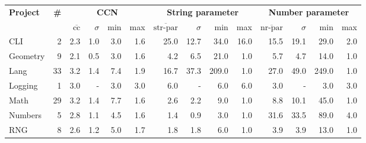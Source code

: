 \begin{tabular}{ l r | r@{\hskip 0.08in}r@{\hskip 0.08in}r@{\hskip 0.08in}r | r@{\hskip 0.08in}r@{\hskip 0.08in}r@{\hskip 0.08in}r | r@{\hskip 0.08in}r@{\hskip 0.08in}r@{\hskip 0.08in}r }
\hline 
\textbf{Project} & \textbf{\#} & \multicolumn{4}{c}{\textbf{CCN}} & \multicolumn{4}{c}{\textbf{String parameter}} & \multicolumn{4}{c}{\textbf{Number parameter}} \\ 
  &   & $\overline{\text{cc}}$ & $\sigma$ & min & max & $\overline{\text{str-par}}$ & $\sigma$ & min & max & $\overline{\text{nr-par}}$ & $\sigma$ & min & max \\ 
\hline 
CLI & 2 &2.3 &1.0 &3.0 & 1.6 &25.0 &12.7 &34.0 & 16.0 &15.5 &19.1 &29.0 & 2.0 \\ 
Geometry & 9 &2.1 &0.5 &3.0 & 1.6 &4.2 &6.5 &21.0 & 1.0 &5.7 &4.7 &14.0 & 1.0 \\ 
Lang & 33 &3.2 &1.4 &7.4 & 1.9 &16.7 &37.3 &209.0 & 1.0 &27.0 &49.0 &249.0 & 1.0 \\ 
Logging & 1 &3.0 &- &3.0 & 3.0 &6.0 &- &6.0 & 6.0 &3.0 &- &3.0 & 3.0 \\ 
Math & 29 &3.2 &1.4 &7.7 & 1.6 &2.6 &2.2 &9.0 & 1.0 &8.8 &10.1 &45.0 & 1.0 \\ 
Numbers & 5 &2.8 &1.1 &4.5 & 1.6 &1.4 &0.9 &3.0 & 1.0 &31.6 &33.5 &89.0 & 4.0 \\ 
RNG & 8 &2.6 &1.2 &5.0 & 1.7 &1.8 &1.8 &6.0 & 1.0 &3.9 &3.9 &13.0 & 1.0 \\ 
\hline 
\end{tabular}